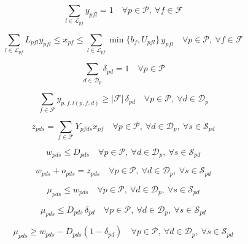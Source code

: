 \documentclass{article}
\begin{document}
\begin{equation}
\sum_{l \in \mathcal{L}_{pf}} y_{pfl} = 1
\quad \forall p \in \mathcal{P},\ \forall f \in \mathcal{F}
\tag{22c}
\end{equation}

\begin{equation}
\sum_{l \in \mathcal{L}_{pf}} L_{pfl} y_{pfl}
\le x_{pf}
\le \sum_{l \in \mathcal{L}_{pf}} \min\{b_f, U_{pfl}\}\, y_{pfl}
\quad \forall p \in \mathcal{P},\ \forall f \in \mathcal{F}
\tag{22d}
\end{equation}

\begin{equation}
\sum_{d \in \mathcal{D}_p} \delta_{pd} = 1
\quad \forall p \in \mathcal{P}
\tag{22e}
\end{equation}

\begin{equation}
\sum_{f \in \mathcal{F}} y_{p,f,l(p,f,d)} \ge |\mathcal{F}|\, \delta_{pd}
\quad \forall p \in \mathcal{P},\ \forall d \in \mathcal{D}_p
\tag{22f}
\end{equation}

\begin{equation}
z_{pds} = \sum_{f \in \mathcal{F}} Y_{pfds} x_{pf}
\quad \forall p \in \mathcal{P},\ \forall d \in \mathcal{D}_p,\ \forall s \in \mathcal{S}_{pd}
\tag{22g}
\end{equation}

\begin{equation}
w_{pds} \le D_{pds}
\quad \forall p \in \mathcal{P},\ \forall d \in \mathcal{D}_p,\ \forall s \in \mathcal{S}_{pd}
\tag{22h}
\end{equation}

\begin{equation}
w_{pds} + o_{pds} = z_{pds}
\quad \forall p \in \mathcal{P},\ \forall d \in \mathcal{D}_p,\ \forall s \in \mathcal{S}_{pd}
\tag{22i}
\end{equation}

\begin{equation}
\mu_{pds} \le w_{pds}
\quad \forall p \in \mathcal{P},\ \forall d \in \mathcal{D}_p,\ \forall s \in \mathcal{S}_{pd}
\tag{22n}
\end{equation}

\begin{equation}
\mu_{pds} \le D_{pds}\, \delta_{pd}
\quad \forall p \in \mathcal{P},\ \forall d \in \mathcal{D}_p,\ \forall s \in \mathcal{S}_{pd}
\tag{22o}
\end{equation}

\begin{equation}
\mu_{pds} \ge w_{pds} - D_{pds}(1 - \delta_{pd})
\quad \forall p \in \mathcal{P},\ \forall d \in \mathcal{D}_p,\ \forall s \in \mathcal{S}_{pd}
\tag{22p}
\end{equation}
\end{document}
